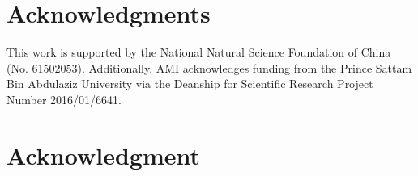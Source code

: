 \documentclass[10pt,journal,compsoc]{IEEEtran}
\begin{document}
  \section*{Acknowledgments}
  This work is supported by the National Natural Science Foundation of China (No. 61502053). Additionally, AMI acknowledges funding from the Prince Sattam Bin Abdulaziz University via the Deanship for Scientific Research Project Number 2016/01/6641.

\else
  \section*{Acknowledgment}
\fi

\ifCLASSOPTIONcaptionsoff
  \newpage
\fi


\end{document}
